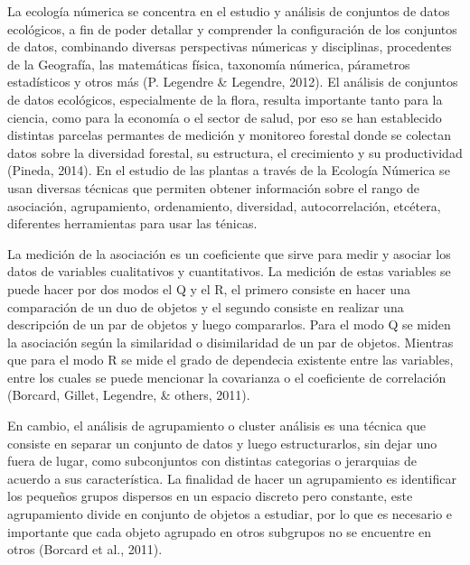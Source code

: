\documentclass[11pt,]{article}
\begin{document}
La ecología númerica se concentra en el estudio y análisis de conjuntos
de datos ecológicos, a fin de poder detallar y comprender la
configuración de los conjuntos de datos, combinando diversas
perspectivas númericas y disciplinas, procedentes de la Geografía, las
matemáticas física, taxonomía númerica, párametros estadísticos y otros
más (P. Legendre \& Legendre, 2012). El análisis de conjuntos de datos
ecológicos, especialmente de la flora, resulta importante tanto para la
ciencia, como para la economía o el sector de salud, por eso se han
establecido distintas parcelas permantes de medición y monitoreo
forestal donde se colectan datos sobre la diversidad forestal, su
estructura, el crecimiento y su productividad (Pineda, 2014). En el
estudio de las plantas a través de la Ecología Númerica se usan diversas
técnicas que permiten obtener información sobre el rango de asociación,
agrupamiento, ordenamiento, diversidad, autocorrelación, etcétera,
diferentes herramientas para usar las ténicas.

La medición de la asociación es un coeficiente que sirve para medir y
asociar los datos de variables cualitativos y cuantitativos. La medición
de estas variables se puede hacer por dos modos el Q y el R, el primero
consiste en hacer una comparación de un duo de objetos y el segundo
consiste en realizar una descripción de un par de objetos y luego
compararlos. Para el modo Q se miden la asociación según la similaridad
o disimilaridad de un par de objetos. Mientras que para el modo R se
mide el grado de dependecia existente entre las variables, entre los
cuales se puede mencionar la covarianza o el coeficiente de correlación
(Borcard, Gillet, Legendre, \& others, 2011).

En cambio, el análisis de agrupamiento o cluster análisis es una técnica
que consiste en separar un conjunto de datos y luego estructurarlos, sin
dejar uno fuera de lugar, como subconjuntos con distintas categorias o
jerarquias de acuerdo a sus característica. La finalidad de hacer un
agrupamiento es identificar los pequeños grupos dispersos en un espacio
discreto pero constante, este agrupamiento divide en conjunto de objetos
a estudiar, por lo que es necesario e importante que cada objeto
agrupado en otros subgrupos no se encuentre en otros (Borcard et al.,
2011).
\end{document}
